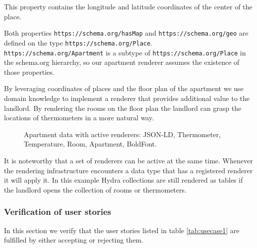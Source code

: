This property contains the longitude and latitude coordinates of the center of the place.

Both properties \lstinline{https://schema.org/hasMap} and \lstinline{https://schema.org/geo} are defined on the type \lstinline{https://schema.org/Place}. \lstinline{https://schema.org/Apartment} is a subtype of \lstinline{https://schema.org/Place} in the schema.org hierarchy, so our apartment renderer assumes the existence of those properties.

By leveraging coordinates of places and the floor plan of the apartment we use domain knowledge to implement a renderer that provides additional value to the landlord. By rendering the rooms on the floor plan the landlord can grasp the locations of thermometers in a more natural way.

\begin{figure}[!htb]
  \caption{Apartment data with active renderers: JSON-LD, Thermometer, Temperature, Room, Apartment, BoldFont.}
  \label{fig:apartmentrenderer}
\end{figure}

It is noteworthy that a set of renderers can be active at the same time. Whenever the rendering infrastructure encounters a data type that has a registered renderer it will apply it. In this example Hydra collections are still rendered as tables if the landlord opens the collection of rooms or thermometers.

\subsubsection{Verification of user stories}
In this section we verify that the user stories listed in table \ref{tab:usecase1} are fulfilled by either accepting or rejecting them.

